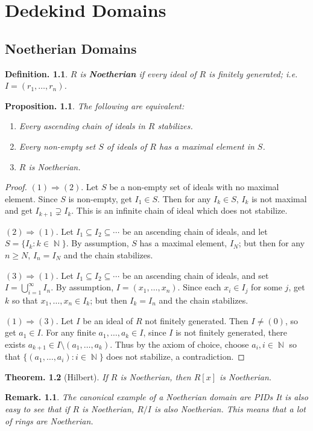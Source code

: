 \documentclass[11pt, a4paper]{memoir}
\DeclareMathOperator{\N}{{\mathbb{N}}}
\theoremstyle{change}
\newtheorem{theorem}{Theorem.}[section]
\newtheorem{proposition}[theorem]{Proposition.}
\theoremstyle{plain}
\theoremstyle{nonumberplain}
\newtheorem{definition}{Definition.}
\newtheorem{remark}{Remark.}
\newtheorem{proof}{Proof}
\numberwithin{equation}{section}
\begin{document}
\chapter{Dedekind Domains}
\section{Noetherian Domains}
\begin{definition}
    $R$ is \textbf{Noetherian} if every ideal of $R$ is finitely generated; i.e. $I=(r_1,\ldots,r_n)$.
\end{definition}
\begin{proposition}\label{noe}
    The following are equivalent:
    \begin{enumerate}[nolistsep]
        \item Every ascending chain of ideals in $R$ stabilizes.
        \item Every non-empty set $S$ of ideals of $R$ has a maximal element in $S$.
        \item $R$ is Noetherian.
    \end{enumerate}
\end{proposition}
\begin{proof}
    $(1)\Rightarrow (2)$.
    Let $S$ be a non-empty set of ideals with no maximal element.
    Since $S$ is non-empty, get $I_1\in S$.
    Then for any $I_k\in S$, $I_k$ is not maximal and get $I_{k+1}\supsetneq I_k$.
    This is an infinite chain of ideal which does not stabilize.

    $(2)\Rightarrow(1)$.
    Let $I_1\subseteq I_2\subseteq\cdots$ be an ascending chain of ideals, and let $S=\{I_k:k\in\N\}$.
    By assumption, $S$ has a maximal element, $I_N$; but then for any $n\geq N$, $I_n=I_N$ and the chain stabilizes.

    $(3)\Rightarrow(1)$.
    Let $I_1\subseteq I_2\subseteq\cdots$ be an ascending chain of ideals, and set $I=\bigcup_{i=1}^\infty I_n$.
    By assumption, $I=(x_1,\ldots,x_n)$.
    Since each $x_i\in I_j$ for some $j$, get $k$ so that $x_1,\ldots,x_n\in I_k$; but then $I_k=I_n$ and the chain stabilizes.

    $(1)\Rightarrow(3)$.
    Let $I$ be an ideal of $R$ not finitely generated.
    Then $I\neq(0)$, so get $a_1\in I$.
    For any finite $a_1,\ldots,a_k\in I$, since $I$ is not finitely generated, there exists $a_{k+1}\in I\setminus(a_1,\ldots,a_k)$.
    Thus by the axiom of choice, choose $a_i,i\in\N$ so that $\{(a_1,\ldots,a_i):i\in\N\}$ does not stabilize, a contradiction.
\end{proof}
\begin{theorem}[Hilbert]
    If $R$ is Noetherian, then $R[x]$ is Noetherian.
\end{theorem}
\begin{remark}
    The canonical example of a Noetherian domain are PIDs
    It is also easy to see that if $R$ is Noetherian, $R/I$ is also Noetherian.
    This means that a lot of rings are Noetherian.
\end{remark}
\end{document}
